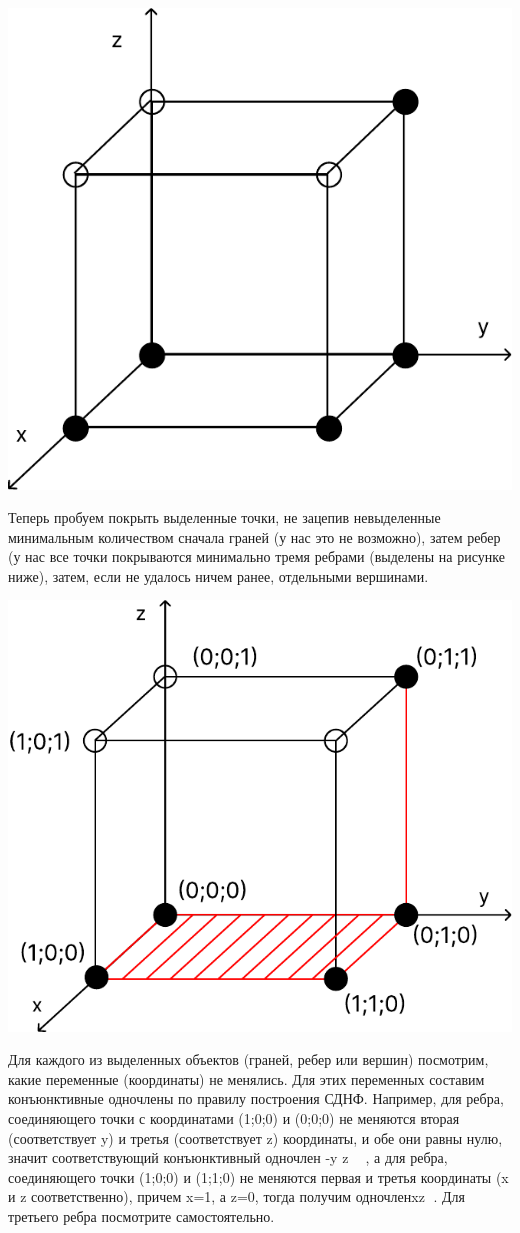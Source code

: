 \documentclass[11pt]{article}
\begin{document}
\includegraphics{t7.pdf}

Теперь пробуем покрыть выделенные точки, не зацепив невыделенные
минимальным количеством сначала граней (у нас это не возможно), затем ребер
(у нас все точки покрываются минимально тремя ребрами (выделены на
рисунке ниже), затем, если не удалось ничем ранее, отдельными вершинами.

\includegraphics{t7_2.pdf}

Для каждого из выделенных объектов (граней, ребер или вершин)
посмотрим, какие переменные (координаты) не менялись. Для этих переменных
составим конъюнктивные одночлены по правилу построения СДНФ. Например,
для ребра, соединяющего точки с координатами (1;0;0) и (0;0;0) не меняются
вторая (соответствует y) и третья (соответствует z) координаты, и обе они
равны нулю, значит соответствующий конъюнктивный одночлен -y z  , а для
ребра, соединяющего точки (1;0;0) и (1;1;0) не меняются первая и третья
координаты (x и z соответственно), причем x=1, а z=0, тогда получим одночленxz
. Для третьего ребра посмотрите самостоятельно.
\end{document}
